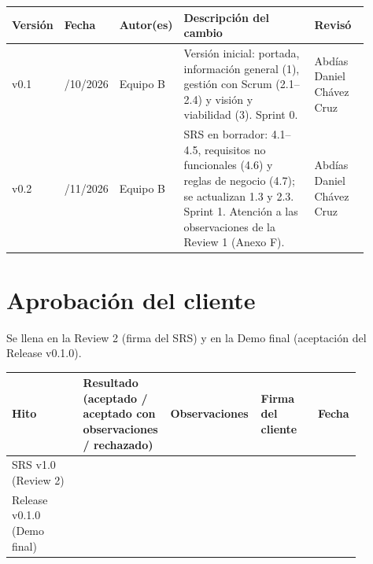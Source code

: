 {\small
\begin{longtable}[]{@{}
  >{\raggedright\arraybackslash}p{0.07\linewidth}
  >{\raggedright\arraybackslash}p{0.12\linewidth}
  >{\raggedright\arraybackslash}p{0.12\linewidth}
  >{\raggedright\arraybackslash}p{0.43\linewidth}
  >{\raggedright\arraybackslash}p{0.16\linewidth}@{}}
\toprule
\textbf{Versión} & \textbf{Fecha} & \textbf{Autor(es)} & \textbf{Descripción del cambio} & \textbf{Revisó} \\
\midrule
v0.1 & 29/10/2026 & Equipo B & Versión inicial: portada, información general (1), gestión con Scrum (2.1--2.4) y visión y viabilidad (3). Sprint 0. & Abdías Daniel Chávez Cruz \\
v0.2 & 11/11/2026 & Equipo B & SRS en borrador: 4.1--4.5, requisitos no funcionales (4.6) y reglas de negocio (4.7); se actualizan 1.3 y 2.3. Sprint 1. Atención a las observaciones de la Review 1 (Anexo F). & Abdías Daniel Chávez Cruz \\
\bottomrule
\end{longtable}
}

\section*{Aprobación del cliente}

Se llena en la Review 2 (firma del SRS) y en la Demo final (aceptación del Release v0.1.0).

{\small
\begin{longtable}[]{@{}
  >{\raggedright\arraybackslash}p{0.2\linewidth}
  >{\raggedright\arraybackslash}p{0.2\linewidth}
  >{\raggedright\arraybackslash}p{0.22\linewidth}
  >{\raggedright\arraybackslash}p{0.16\linewidth}
  >{\raggedright\arraybackslash}p{0.1\linewidth}@{}}
\toprule
\textbf{Hito} & \textbf{Resultado (aceptado / aceptado con observaciones / rechazado)} & \textbf{Observaciones} & \textbf{Firma del cliente} & \textbf{Fecha} \\
\midrule
SRS v1.0 (Review 2) & & & & \\
Release v0.1.0 (Demo final) & & & & \\
\bottomrule
\end{longtable}
}

\clearpage
\tableofcontents
\clearpage








